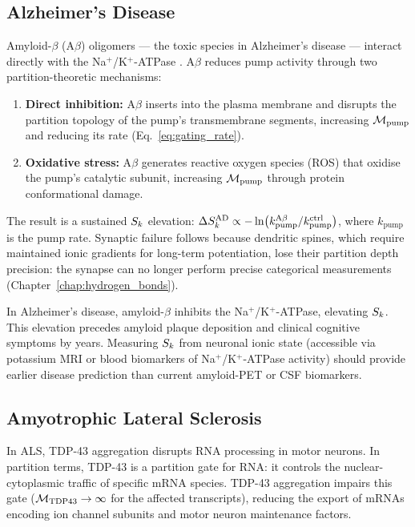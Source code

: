 \subsection{Alzheimer's Disease}
\label{ssec:alzheimer}

Amyloid-$\beta$ (A$\beta$) oligomers --- the toxic species in Alzheimer's
disease --- interact directly with the Na$^+$/K$^+$-ATPase \citep{Mark1995}.
A$\beta$ reduces pump activity through two partition-theoretic mechanisms:
\begin{enumerate}[label=(\roman*)]
  \item \textbf{Direct inhibition:} A$\beta$ inserts into the plasma membrane
        and disrupts the partition topology of the pump's transmembrane
        segments, increasing $\mathcal{M}_{\mathrm{pump}}$ and reducing its
        rate (Eq.~\eqref{eq:gating_rate}).
  \item \textbf{Oxidative stress:} A$\beta$ generates reactive oxygen species
        (ROS) that oxidise the pump's catalytic subunit, increasing
        $\mathcal{M}_{\mathrm{pump}}$ through protein conformational damage.
\end{enumerate}

The result is a sustained $S_k$ elevation:
$\Delta S_k^{\mathrm{AD}} \propto -\ln(k_{\mathrm{pump}}^{\mathrm{A}\beta}/k_{\mathrm{pump}}^{\mathrm{ctrl}})$,
where $k_{\mathrm{pump}}$ is the pump rate. Synaptic failure follows because
dendritic spines, which require maintained ionic gradients for long-term
potentiation, lose their partition depth precision: the synapse can no longer
perform precise categorical measurements (Chapter~\ref{chap:hydrogen_bonds}).

\begin{keyresult}
In Alzheimer's disease, amyloid-$\beta$ inhibits the Na$^+$/K$^+$-ATPase,
elevating $S_k$. This elevation precedes amyloid plaque deposition and
clinical cognitive symptoms by years. Measuring $S_k$ from neuronal ionic
state (accessible via potassium MRI or blood biomarkers of Na$^+$/K$^+$-ATPase
activity) should provide earlier disease prediction than current amyloid-PET
or CSF biomarkers.
\end{keyresult}

\subsection{Amyotrophic Lateral Sclerosis}
\label{ssec:als}

In ALS, TDP-43 aggregation disrupts RNA processing in motor neurons. In
partition terms, TDP-43 is a partition gate for RNA: it controls the
nuclear-cytoplasmic traffic of specific mRNA species. TDP-43 aggregation
impairs this gate ($\mathcal{M}_{\mathrm{TDP43}} \to \infty$ for the affected
transcripts), reducing the export of mRNAs encoding ion channel subunits and
motor neuron maintenance factors.

